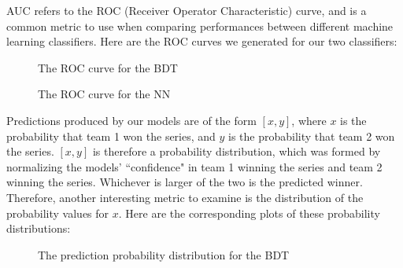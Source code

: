 \documentclass[letterpaper]{article} %
\begin{document}
AUC refers to the ROC (Receiver Operator Characteristic) curve, and is a common metric to use when comparing performances between different machine learning classifiers. Here are the ROC curves we generated for our two classifiers:
\begin{figure}[H]
        \caption{\label{fig:bdt_roc} The ROC curve for the BDT}
\end{figure}
\begin{figure}[!htb]
        \caption{\label{fig:bdt_roc} The ROC curve for the NN}
\end{figure}
Predictions produced by our models are of the form $[x,y]$, where $x$ is the probability that team 1 won the series, and $y$ is the probability that team 2 won the series. $[x,y]$ is therefore a probability distribution, which was formed by normalizing the models' ``confidence" in team 1 winning the series and team 2 winning the series. Whichever is larger of the two is the predicted winner. Therefore, another interesting metric to examine is the distribution of the probability values for $x$. Here are the corresponding plots of these probability distributions:
\begin{figure}[H]
        \caption{\label{fig:bdt_prediction_distribution} The prediction probability distribution for the BDT}
\end{figure}
\end{document}
